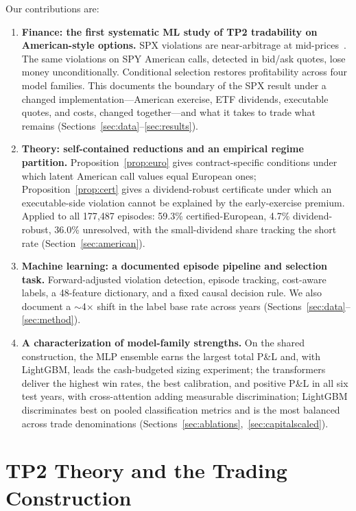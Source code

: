\documentclass[sigconf,review,anonymous]{acmart}
\begin{document}
Our contributions are:
\begin{enumerate}
\item \textbf{Finance: the first systematic ML study of TP2 tradability on American-style options.} SPX violations are near-arbitrage at mid-prices~\cite{glasserman2025tp2}. The same violations on SPY American calls, detected in bid/ask quotes, lose money unconditionally. Conditional selection restores profitability across four model families. This documents the boundary of the SPX result under a changed implementation---American exercise, ETF dividends, executable quotes, and costs, changed together---and what it takes to trade what remains (Sections~\ref{sec:data}--\ref{sec:results}).
\item \textbf{Theory: self-contained reductions and an empirical regime partition.} Proposition~\ref{prop:euro} gives contract-specific conditions under which latent American call values equal European ones; Proposition~\ref{prop:cert} gives a dividend-robust certificate under which an executable-side violation cannot be explained by the early-exercise premium. Applied to all 177{,}487 episodes: 59.3\% certified-European, 4.7\% dividend-robust, 36.0\% unresolved, with the small-dividend share tracking the short rate (Section~\ref{sec:american}).
\item \textbf{Machine learning: a documented episode pipeline and selection task.} Forward-adjusted violation detection, episode tracking, cost-aware labels, a 48-feature dictionary, and a fixed causal decision rule. We also document a $\sim$4$\times$ shift in the label base rate across years (Sections~\ref{sec:data}--\ref{sec:method}).
\item \textbf{A characterization of model-family strengths.} On the shared construction, the MLP ensemble earns the largest total P\&L and, with LightGBM, leads the cash-budgeted sizing experiment; the transformers deliver the highest win rates, the best calibration, and positive P\&L in all six test years, with cross-attention adding measurable discrimination; LightGBM discriminates best on pooled classification metrics and is the most balanced across trade denominations (Sections~\ref{sec:ablations},~\ref{sec:capitalscaled}).
\end{enumerate}

\section{TP2 Theory and the Trading Construction}
\label{sec:related}
\end{document}
